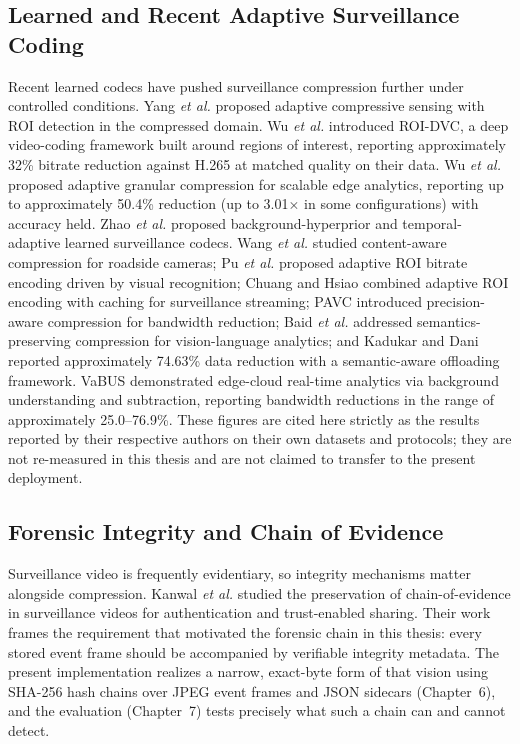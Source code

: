 \subsection{Learned and Recent Adaptive Surveillance Coding}

Recent learned codecs have pushed surveillance compression further under controlled conditions. Yang \textit{et al.} \cite{Yang2024AVCSR} proposed adaptive compressive sensing with ROI detection in the compressed domain. Wu \textit{et al.} \cite{Wu2024ROIDVC} introduced ROI-DVC, a deep video-coding framework built around regions of interest, reporting approximately 32\% bitrate reduction against H.265 at matched quality on their data. Wu \textit{et al.} \cite{Wu2025How2Compress} proposed adaptive granular compression for scalable edge analytics, reporting up to approximately 50.4\% reduction (up to 3.01$\times$ in some configurations) with accuracy held. Zhao \textit{et al.} proposed background-hyperprior \cite{Zhao2025ASVC} and temporal-adaptive learned \cite{Zhao2025TALC} surveillance codecs. Wang \textit{et al.} \cite{Wang2025CAVC} studied content-aware compression for roadside cameras; Pu \textit{et al.} \cite{Pu2025AdaptiveBitrate} proposed adaptive ROI bitrate encoding driven by visual recognition; Chuang and Hsiao \cite{Chuang2025AdaptiveROI} combined adaptive ROI encoding with caching for surveillance streaming; PAVC \cite{PAVC2025} introduced precision-aware compression for bandwidth reduction; Baid \textit{et al.} \cite{Baid2026BLUE} addressed semantics-preserving compression for vision-language analytics; and Kadukar and Dani \cite{Kadukar2026Semantic} reported approximately 74.63\% data reduction with a semantic-aware offloading framework. VaBUS \cite{Wang2023VaBUS} demonstrated edge-cloud real-time analytics via background understanding and subtraction, reporting bandwidth reductions in the range of approximately 25.0--76.9\%. These figures are cited here strictly as the results reported by their respective authors on their own datasets and protocols; they are not re-measured in this thesis and are not claimed to transfer to the present deployment.

\subsection{Forensic Integrity and Chain of Evidence}

Surveillance video is frequently evidentiary, so integrity mechanisms matter alongside compression. Kanwal \textit{et al.} \cite{Kanwal2020Chain} studied the preservation of chain-of-evidence in surveillance videos for authentication and trust-enabled sharing. Their work frames the requirement that motivated the forensic chain in this thesis: every stored event frame should be accompanied by verifiable integrity metadata. The present implementation realizes a narrow, exact-byte form of that vision using SHA-256 hash chains over JPEG event frames and JSON sidecars (Chapter~6), and the evaluation (Chapter~7) tests precisely what such a chain can and cannot detect.

